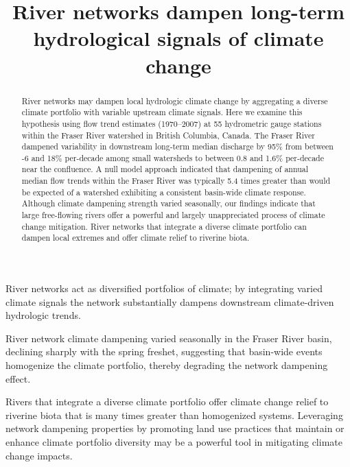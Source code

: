 \documentclass[linenumbers,draft]{AGUJournal}
\begin{document}
\title{River networks dampen long-term hydrological signals of climate change}



\begin{keypoints}
\item River networks act as diversified portfolios of climate; by integrating varied climate signals the network substantially dampens downstream climate-driven hydrologic trends.
\item River network climate dampening varied seasonally in the Fraser River basin, declining sharply with the spring freshet, suggesting that basin-wide events homogenize the climate portfolio, thereby degrading the network dampening effect.
\item Rivers that integrate a diverse climate portfolio offer climate change relief to riverine biota that is many times greater than homogenized systems. Leveraging network dampening properties by promoting land use practices that maintain or enhance climate portfolio diversity may be a powerful tool in mitigating climate change impacts. 
\end{keypoints}

\begin{abstract}
River networks may dampen local hydrologic climate change by aggregating a diverse climate portfolio with variable upstream climate signals. Here we examine this hypothesis using flow trend estimates (1970--2007) at 55 hydrometric gauge stations within the Fraser River watershed in British Columbia, Canada. The Fraser River dampened variability in downstream long-term median discharge by 95\% from between -6 and 18\% per-decade among small watersheds to between 0.8 and 1.6\% per-decade near the confluence. A null model approach indicated that dampening of annual median flow trends within the Fraser River was typically 5.4 times greater than would be expected of a watershed exhibiting a consistent basin-wide climate response. Although climate dampening strength varied seasonally, our findings indicate that large free-flowing rivers offer a powerful and largely unappreciated process of climate change mitigation. River networks that integrate a diverse climate portfolio can dampen local extremes and offer climate relief to riverine biota.
\end{abstract}
\end{document}
